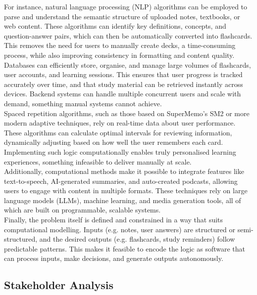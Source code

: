 \documentclass[a4paper,12pt]{article}
\begin{document}
For instance, natural language processing (NLP) algorithms can be employed to parse and understand the semantic structure of uploaded notes, textbooks, or web content. These algorithms can identify key definitions, concepts, and question-answer pairs, which can then be automatically converted into flashcards. This removes the need for users to manually create decks, a time-consuming process, while also improving consistency in formatting and content quality.\\

Databases can efficiently store, organise, and manage large volumes of flashcards, user accounts, and learning sessions. This ensures that user progress is tracked accurately over time, and that study material can be retrieved instantly across devices. Backend systems can handle multiple concurrent users and scale with demand, something manual systems cannot achieve.\\

Spaced repetition algorithms, such as those based on SuperMemo’s SM2 or more modern adaptive techniques, rely on real-time data about user performance. These algorithms can calculate optimal intervals for reviewing information, dynamically adjusting based on how well the user remembers each card. Implementing such logic computationally enables truly personalised learning experiences, something infeasible to deliver manually at scale.\\
\newpage
Additionally, computational methods make it possible to integrate features like text-to-speech, AI-generated summaries, and auto-created podcasts, allowing users to engage with content in multiple formats. These techniques rely on large language models (LLMs), machine learning, and media generation tools, all of which are built on programmable, scalable systems.\\

Finally, the problem itself is defined and constrained in a way that suits computational modelling. Inputs (e.g. notes, user answers) are structured or semi-structured, and the desired outputs (e.g. flashcards, study reminders) follow predictable patterns. This makes it feasible to encode the logic as software that can process inputs, make decisions, and generate outputs autonomously.\\

\subsection{Stakeholder Analysis}
\end{document}
